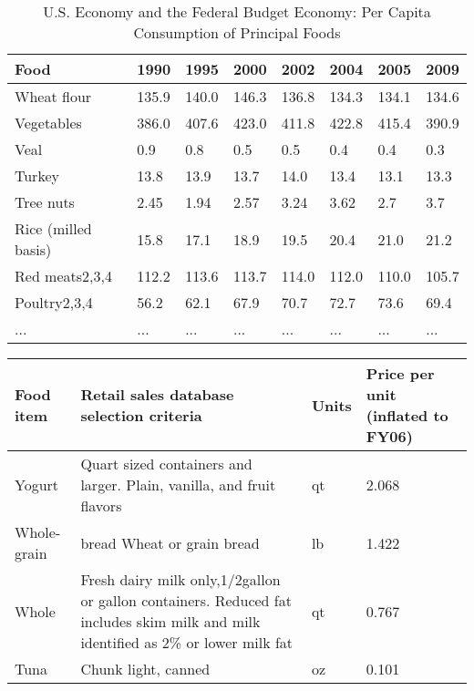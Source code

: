 \begin{itemize}
	\begin{table*}[t]
		\setlength{\tabcolsep}{0.9\tabcolsep}
		\begin{tabular}{ |l|l|l|l|l|l|l|l|  }
			\hline
			Food&	1990&	1995&	2000&	2002&	2004&	2005&	2009\\
			\hline
			Wheat flour& 	135.9& 	140.0& 	146.3& 	136.8& 	134.3& 	134.1& 	134.6\\
			Vegetables& 	386.0& 	407.6& 	423.0& 	411.8& 	422.8& 	415.4& 	390.9\\
			Veal& 	0.9& 	0.8& 	0.5& 	0.5& 	0.4& 	0.4& 	0.3\\
			Turkey& 	13.8& 	13.9& 	13.7& 	14.0& 	13.4& 	13.1& 	13.3\\
			Tree nuts& 	2.45& 	1.94& 	2.57& 	3.24& 	3.62& 	2.7& 	3.7\\
			Rice (milled basis)& 	15.8& 	17.1& 	18.9& 	19.5& 	20.4& 	21.0& 	21.2\\
			Red meats2,3,4& 	112.2& 	113.6& 	113.7& 	114.0& 	112.0& 	110.0& 	105.7\\
			Poultry2,3,4& 	56.2& 	62.1& 	67.9& 	70.7& 	72.7& 	73.6& 	69.4\\
			... & ...& ...& ...& ...& ...& ...& ...\\
			\hline
			
		\end{tabular}
		\vspace{.2cm}
		\caption{ U.S. Economy and the Federal Budget Economy: Per Capita Consumption of Principal Foods \label{tab:q1-result1}}
	\end{table*}
	
	\begin{table*}[!ht]
	\setlength\extrarowheight{2pt} %
		\begin{tabular}{ |l|p{8cm}|l|p{4cm}|  }
			\hline
			\textbf{Food item}&	\textbf{Retail sales database selection criteria}&	\textbf{Units}&	\textbf{Price per unit (inflated to FY06)}\\
			\hline
			
			Yogurt& 	Quart sized containers and larger. Plain, vanilla, and fruit flavors& 	qt& 	2.068\\\hline
			Whole-grain& bread 	Wheat or grain bread& 	lb& 	1.422\\\hline
			Whole& 	Fresh dairy milk only,1/2gallon or gallon containers. Reduced fat includes skim milk and milk identified as 2\% or lower milk fat& 	qt& 	0.767\\\hline

			Tuna& 	Chunk light, canned& 	oz& 	0.101\\\hline
		

\end{tabular}
\end{table*}
\end{itemize}
